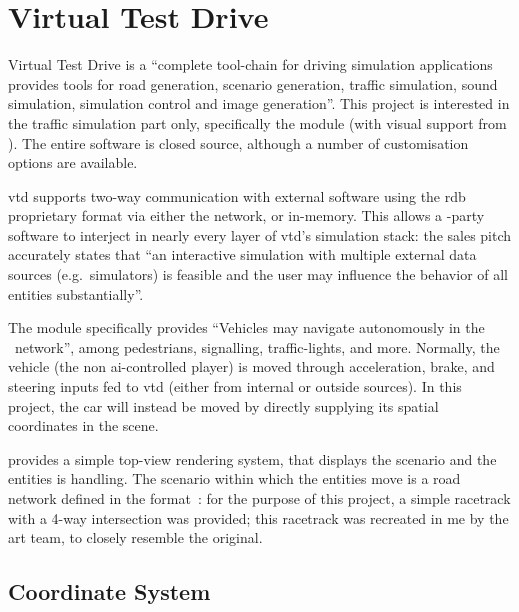 \section{Virtual Test Drive}\label{sc:software:vtd}

Virtual Test Drive is a \enquote{complete tool-chain for driving simulation applications \FONTnormal{[that]} provides tools for road generation, scenario generation, traffic simulation, sound simulation, simulation control and image generation}{\cite{software:vtd}}. This project is interested in the traffic simulation part only, specifically the  module (with visual support from ). The entire software is closed source, although a number of customisation options are available.

\gls{vtd} supports two-way communication with external software using the \gls{rdb} proprietary format via either the network, or in-memory. This allows a -party software to interject in nearly every layer of \gls{vtd}'s simulation stack: the sales pitch accurately states that \enquote{an interactive simulation with multiple external data sources (e.g.\ simulators) is feasible and the user may influence the behavior of all entities substantially}{\cite{software:vtraffic}}.

The  module specifically provides \enquote{Vehicles \FONTnormal{[that]} may navigate autonomously in the \CHARomissis\ network}{\cite{software:vtraffic}}, among pedestrians, signalling, traffic-lights, and more. Normally, the  vehicle (the non \gls{ai}-controlled player) is moved through acceleration, brake, and steering inputs fed to \gls{vtd} (either from internal or outside sources). In this project, the  car will instead be moved by directly supplying its spatial coordinates in the scene.

 provides a simple top-view rendering system, that displays the scenario and the entities  is handling. The scenario within which the entities move is a road network defined in the  format~\cite{software:opendrive}: for the purpose of this project, a simple racetrack with a 4-way intersection was provided; this racetrack was recreated in \gls{me} by the art team, to closely resemble the original.

\subsection{Coordinate System} %

